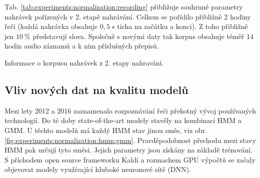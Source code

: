 Tab. \ref{tab:experiments:normalization:recording} přibližuje souhrnné parametry nahrávek pořízených v 2. etapě nahrávání. Celkem se pořídilo přibližně 2 hodiny řeči (každá nahrávka obsahuje $0,5\ s$ ticha na začátku a konci). Z toho přibližně jen $10\ \%$ představují slova. Společně s novými daty tak korpus obsahuje téměř $14$ hodin audio záznamů a k nim příslušných přepisů.

\begin{table}[htpb]
  \centering
  \def\arraystretch{1.5}
  \caption{Informace o korpusu nahrávek z 2. etapy nahravání.}
  \label{tab:experiments:normalization:recording}
\end{table}

\subsection{Vliv nových dat na kvalitu modelů}
\label{chap:experiments:normalization:quality}

Mezi lety 2012 a 2016 zaznamenalo rozpoznávání řeči překotný vývoj používaných technologií. Do té doby state-of-the-art modely stavěly na kombinaci HMM a  GMM. U těchto modelů má každý HMM stav jinou směs, viz obr. \ref{fig:experiments:normalization:hmm:gmm}. Pravděpodobnost přechodu mezi stavy HMM pak určují tyto směsi. Jejich parametry jsou získány na základě trénování. S příchodem open source frameworku Kaldi \cite{Kaldi2011} a rozmachem GPU výpočtů se začaly objevovat modely využívající hluboké neuronové sítě (DNN).

